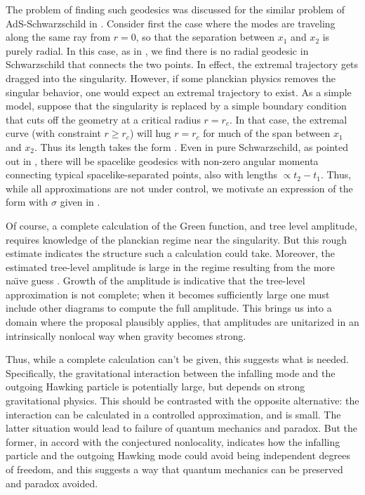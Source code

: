 The problem of finding such geodesics was discussed for the similar problem of AdS-Schwarzschild in .  Consider first the case where the modes are traveling along the same ray from $r=0$, so that the separation  between $x_1$ and $x_2$ is purely radial.   In this case, as in \FHKS, we find there is no radial geodesic in Schwarzschild that connects the two points.  In effect, the extremal trajectory gets dragged into the singularity.  However, if some planckian physics removes the singular behavior, one would expect an extremal trajectory to exist.  As a simple model, suppose that the singularity is replaced by a simple boundary condition that cuts off the geometry at a critical radius $r=r_c$.  In that case, the extremal curve (with constraint $r\geq r_c$) will hug $r=r_c$ for much of the span between $x_1$ and $x_2$.  Thus its length takes the form \distance.  Even in pure Schwarzschild, as pointed out in \FHKS, there will be spacelike geodesics with non-zero angular momenta connecting typical spacelike-separated points, also with lengths $\propto t_2-t_1$.  Thus, while all approximations are not under control, we motivate an expression of the form
%
\eqn{}
%
with $\sigma$ given in \distance.

Of course, a complete calculation of the Green function, and tree level amplitude, requires knowledge of the planckian regime near the singularity.  But this rough estimate indicates the structure such a calculation could take.  Moreover, the estimated tree-level amplitude is large in the regime resulting from the more na\"\i ve guess \locbd.  Growth of the amplitude is indicative that the tree-level approximation is not complete; when it becomes sufficiently large one must include other diagrams to compute the full amplitude.  This brings us into a domain where the proposal plausibly applies,  that  amplitudes are unitarized in an intrinsically nonlocal way when gravity becomes strong.  

Thus, while a complete calculation can't be given, this suggests  what is needed.  Specifically, the gravitational interaction between the infalling mode and the outgoing Hawking particle is potentially large, but depends on strong gravitational physics.  This should be contrasted with the opposite alternative:  the interaction can be calculated in a controlled approximation, and is small.  The latter situation would lead to failure of quantum mechanics and paradox.  But the former, in accord with the conjectured nonlocality, indicates how the infalling particle and the outgoing Hawking mode could avoid being independent degrees of freedom, and this suggests a way that quantum mechanics can be preserved and paradox avoided.

